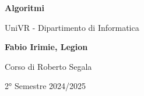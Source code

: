 \begin{titlepage}
	\begin{center}
		\vspace*{1cm}

		\Huge
		\textbf{Algoritmi}

		\vspace{0.5cm}
		\LARGE
		UniVR - Dipartimento di Informatica

		\vspace{1.5cm}

		\textbf{Fabio Irimie, Legion}

		\vfill


		\vspace{0.8cm}

    Corso di Roberto Segala

		2° Semestre 2024/2025

	\end{center}
\end{titlepage}
